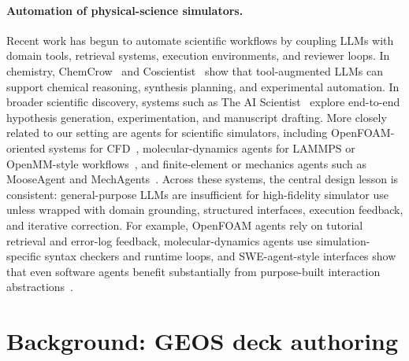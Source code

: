 \documentclass{article}
\begin{document}
\paragraph{Automation of physical-science simulators.}
Recent work has begun to automate scientific workflows by coupling LLMs with domain tools, retrieval systems, execution environments, and reviewer loops. In chemistry, ChemCrow~\cite{bran2024chemcrow} and Coscientist~\cite{boiko2023coscientist} show that tool-augmented LLMs can support chemical reasoning, synthesis planning, and experimental automation. In broader scientific discovery, systems such as The AI Scientist~\cite{lu2024aiscientist,yamada2025ai} explore end-to-end hypothesis generation, experimentation, and manuscript drafting. More closely related to our setting are agents for scientific simulators, including OpenFOAM-oriented systems for CFD~\cite{chen2024metaopenfoam,pandey2025openfoamgpt,foamagent2025}, molecular-dynamics agents for LAMMPS or OpenMM-style workflows~\cite{kim2024mdagents,shi2026mdagent2,guilbert2025dynamate,zhao2026polyjarvis}, and finite-element or mechanics agents such as MooseAgent and MechAgents~\cite{zhan2025mooseagent,ni2024mechagents}. Across these systems, the central design lesson is consistent: general-purpose LLMs are insufficient for high-fidelity simulator use unless wrapped with domain grounding, structured interfaces, execution feedback, and iterative correction. For example, OpenFOAM agents rely on tutorial retrieval and error-log feedback, molecular-dynamics agents use simulation-specific syntax checkers and runtime loops, and SWE-agent-style interfaces show that even software agents benefit substantially from purpose-built interaction abstractions~\cite{yang2024sweagent}.


\section{Background: GEOS deck authoring}
\label{sec:background}
\end{document}
